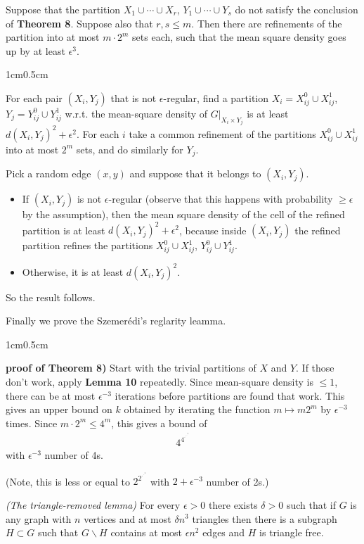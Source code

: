 \documentclass[10pt,a4paper]{report}
\newenvironment{proof}
{\begin{changemargin}{1cm}{0.5cm}
	}%
	{\end{changemargin}
}
\begin{document}
 Suppose that the partition $X_1 \cup \cdots \cup X_r$, $Y_1 \cup \cdots \cup Y_s$ do not satisfy the conclusion of \textbf{Theorem 8}. Suppose also that $r,s\leq m$. Then there are refinements of the partition into at most $m\cdot 2^m$ sets each, such that the mean square density goes up by at least $\epsilon^3$.
\begin{proof}
\pf For each pair $(X_i, Y_j)$ that is not $\epsilon$-regular, find a partition $X_i = X_{ij}^0 \cup X_{ij}^1$, $Y_j = Y_{ij}^0 \cup Y_{ij}^1$ w.r.t. the mean-square density of $G\big|_{X_i \times Y_j}$ is at least $d(X_i, Y_j)^2 + \epsilon^2$. For each $i$ take a common refinement of the partitions $X_{ij}^0 \cup X_{ij}^1$ into at most $2^m$ sets, and do similarly for $Y_j$.

\quad Pick a random edge $(x,y)$ and suppose that it belongs to $(X_i, Y_j)$.
\begin{itemize}
\item If $(X_i, Y_j)$ is not $\epsilon$-regular (observe that this happens with probability $\geq \epsilon$ by the assumption), then the mean square density of the cell of the refined partition is at least $d(X_i, Y_j)^2 + \epsilon^2$, because inside $(X_i, Y_j)$ the refined partition refines the partitions $X_{ij}^0 \cup X_{ij}^1$, $Y_{ij}^0 \cup Y_{ij}^1$.
\item Otherwise, it is at least $d(X_i, Y_j)^2$. 
\end{itemize}
So the result follows.

\eop
\end{proof}
\s

Finally we prove the Szemer\'{e}di's reglarity leamma.
\s

\begin{proof}
\textbf{proof of Theorem 8)} Start with the trivial partitions of $X$ and $Y$. If those don't work, apply \textbf{Lemma 10} repeatedly. Since mean-square density is $\leq 1$, there can be at most $\epsilon^{-3}$ iterations before partitions are found that work. This gives an upper bound on $k$ obtained by iterating the function $m \mapsto m2^m$ by $\epsilon^{-3}$ times. Since $m \cdot 2^m \leq 4^m$, this gives a bound of
\begin{align*}
4^{4^{\cdot^{{\cdot}^{\cdot^{4}}}}}
\end{align*}
with $\epsilon^{-3}$ number of 4s.

\eop

(Note, this is less or equal to $2^{2^{\cdot^{{\cdot}^{\cdot^{2}}}}}$ with $2+\epsilon^{-3}$ number of 2s.)


\end{proof}
\s

 \emph{(The triangle-removed lemma)} For every $\epsilon>0$ there exists $\delta >0$ such that if $G$ is any graph with $n$ vertices and at most $\delta n^3$ triangles then there is a subgraph $H\subset G$ such that $G \backslash H$ contains at most $\epsilon n^2$ edges and $H$ is triangle free.
\end{document}
